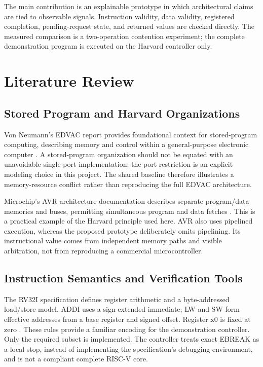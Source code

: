 \documentclass[conference,letterpaper]{IEEEtran}
\begin{document}
The main contribution is an explainable prototype in which architectural claims are tied to observable signals. Instruction validity, data validity, registered completion, pending-request state, and returned values are checked directly. The measured comparison is a two-operation contention experiment; the complete demonstration program is executed on the Harvard controller only.

\section{Literature Review}

\subsection{Stored Program and Harvard Organizations}

Von Neumann's EDVAC report provides foundational context for stored-program computing, describing memory and control within a general-purpose electronic computer \cite{ref1}. A stored-program organization should not be equated with an unavoidable single-port implementation: the port restriction is an explicit modeling choice in this project. The shared baseline therefore illustrates a memory-resource conflict rather than reproducing the full EDVAC architecture.

Microchip's AVR architecture documentation describes separate program/data memories and buses, permitting simultaneous program and data fetches \cite{ref2}. This is a practical example of the Harvard principle used here. AVR also uses pipelined execution, whereas the proposed prototype deliberately omits pipelining. Its instructional value comes from independent memory paths and visible arbitration, not from reproducing a commercial microcontroller.

\subsection{Instruction Semantics and Verification Tools}

The RV32I specification defines register arithmetic and a byte-addressed load/store model. ADDI uses a sign-extended immediate; LW and SW form effective addresses from a base register and signed offset. Register x0 is fixed at zero \cite{ref3}. These rules provide a familiar encoding for the demonstration controller. Only the required subset is implemented. The controller treats exact EBREAK as a local stop, instead of implementing the specification's debugging environment, and is not a compliant complete RISC-V core.
\end{document}
